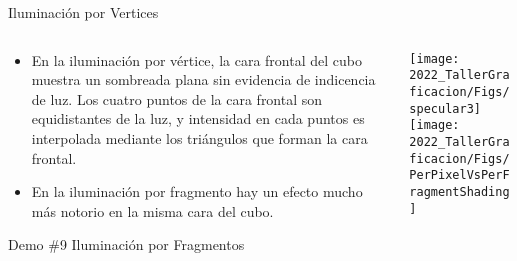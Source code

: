 \begin{frame}{Iluminación por Vertices}
\begin{columns}
\begin{column}{0.5\textwidth}
\begin{itemize}
\item En la iluminación por vértice, la cara frontal del cubo muestra un sombreada plana sin evidencia de indicencia de luz. Los cuatro puntos de la cara frontal son equidistantes de la luz, y intensidad en cada puntos es interpolada mediante los triángulos que forman la cara frontal.
\item En la iluminación por fragmento hay un efecto mucho más notorio en la misma cara del cubo.
\end{itemize}
\begin{block}{Demo \#9}
Iluminación por Fragmentos
\end{block}

\end{column}
\begin{column}{0.5\textwidth}
\begin{center}
\texttt{[image: 2022\_TallerGraficacion/Figs/specular3]}\\
\texttt{[image: 2022\_TallerGraficacion/Figs/PerPixelVsPerFragmentShading]}
 \end{center}
\end{column}
\end{columns}

\end{frame}



